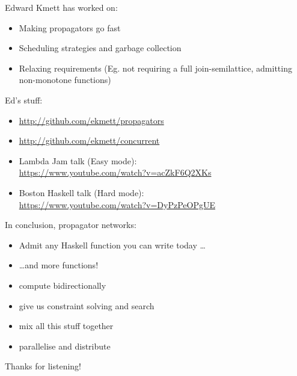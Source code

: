 \documentclass[usenames,dvipsnames,svgnames,table,aspectratio=1610,mathserif]{beamer}
\newcommand{\textslide}[1]{{
\begin{frame}
\begin{center}

#1

\end{center}
\end{frame}
}}
\newcommand{\textslideleft}[1]{{
\begin{frame}

#1

\end{frame}
}}
\begin{document}
\textslideleft{
Edward Kmett has worked on:

\begin{itemize}
\item Making propagators go fast
\item Scheduling strategies and garbage collection
\item Relaxing requirements (Eg. not requiring a full join-semilattice, admitting non-monotone functions)
\end{itemize}

Ed's stuff:
\begin{itemize}
\item \url{http://github.com/ekmett/propagators}
\item \url{http://github.com/ekmett/concurrent}
\item Lambda Jam talk (Easy mode): \\
      \url{https://www.youtube.com/watch?v=acZkF6Q2XKs}
\item Boston Haskell talk (Hard mode): \\
      \url{https://www.youtube.com/watch?v=DyPzPeOPgUE}

\end{itemize}
}

\textslideleft{

In conclusion, propagator networks:

\begin{itemize}
\item Admit any Haskell function you can write today \ldots
\item \ldots and more functions!
\item compute bidirectionally
\item give us constraint solving and search
\item mix all this stuff together
\item parallelise and distribute
\end{itemize}
}


\textslide{\Large{Thanks for listening!}}
\end{document}
